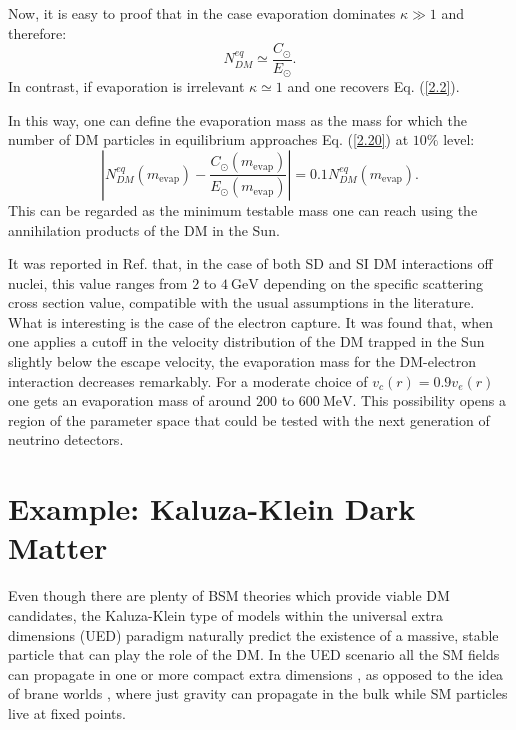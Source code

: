 Now, it is easy to proof that in the case evaporation dominates $\kappa \gg 1$ and therefore:
\begin{equation}\label{2.20}
	N_{DM}^{eq} \simeq \frac{C_{\odot}}{E_{\odot}}.
\end{equation}
In contrast, if evaporation is irrelevant $\kappa \simeq 1$ and one recovers Eq. (\ref{2.2}).

In this way, one can define the evaporation mass as the mass for which the number of DM particles in equilibrium approaches Eq. (\ref{2.20}) at $10 \%$ level:
\begin{equation}\label{2.21}
	\left| N_{DM}^{eq}(m_{\mathrm{evap}}) - \frac{C_{\odot}(m_{\mathrm{evap}})}{E_{\odot}(m_{\mathrm{evap}})} \right| = 0.1 N_{DM}^{eq}(m_{\mathrm{evap}}).
\end{equation}
This can be regarded as the minimum testable mass one can reach using the annihilation products of the DM in the Sun.

It was reported in Ref. \cite{Palomares2017} that, in the case of both SD and SI DM interactions off nuclei, this value ranges from $2$ to $4 \ \mathrm{GeV}$ depending on the specific scattering cross section value, compatible with the usual assumptions in the literature. What is interesting is the case of the electron capture. It was found that, when one applies a cutoff in the velocity distribution of the DM trapped in the Sun slightly below the escape velocity, the evaporation mass for the DM-electron interaction decreases remarkably. For a moderate choice of $v_{c}(r) = 0.9 v_{e}(r)$ one gets an evaporation mass of around $200$ to $600 \ \mathrm{MeV}$. This possibility opens a region of the parameter space that could be tested with the next generation of neutrino detectors.

\section{Example: Kaluza-Klein Dark Matter}
\label{sec:dm_analysis_kk_dm}

Even though there are plenty of BSM theories which provide viable DM candidates, the Kaluza-Klein type of models \cite{Kaluza1921, Klein1926} within the universal extra dimensions (UED) paradigm naturally predict the existence of a massive, stable particle that can play the role of the DM. In the UED scenario all the SM fields can propagate in one or more compact extra dimensions \cite{Appelquist2000}, as opposed to the idea of brane worlds \cite{Arkani-Hamed1998, Randall1999}, where just gravity can propagate in the bulk while SM particles live at fixed points.

